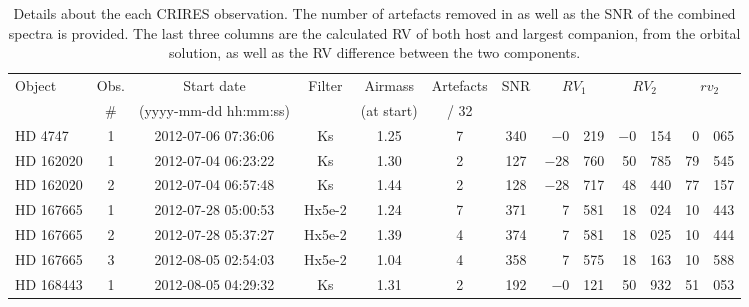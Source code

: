\begin{table*}
    \small
    \centering
    \begin{threeparttable}[b]

        \caption{Details about the each {CRIRES} observation. The number of artefacts removed in  as well as the {SNR} of the combined spectra is provided. The last three columns are the calculated {RV} of both host and largest companion, from the orbital solution, as well as the {RV} difference between the two components.}
        \begin{tabular}{l c c c c c c | r@{.}l r@{.}l r@{.}l}
            \toprule
            Object & Obs.& Start date  & Filter & Airmass  & Artefacts & {SNR} & \multicolumn{2}{c}{\(RV_1\)} & \multicolumn{2}{c}{\(RV_2\)} & \multicolumn{2}{c}{\(rv_2\)}  \\  %
            &  \#   & (yyyy-mm-dd hh:mm:ss)  &  & (at start) & {/ 32} & & \multicolumn{2}{c}{\kmps{}} & \multicolumn{2}{c}{\kmps{}} & \multicolumn{2}{c}{\kmps{}}\\ %
            \midrule
            {HD 4747}   & 1 & 2012-07-06 07:36:06 & Ks            & 1.25     & 7 & 340 & $-$0 & 219 & $-$0  & 154 & 0&065 \\ %
            {HD 162020} & 1 & 2012-07-04 06:23:22 & Ks      & 1.30  & 2 & 127 & $-$28  & 760 & 50 & 785\tnote{a}  & 79&545\tnote{a} \\ %
            {HD 162020} & 2 & 2012-07-04 06:57:48 & Ks      & 1.44   & 2 & 128 & $-$28  & 717 & 48 & 440\tnote{a} & 77&157\tnote{a} \\ %
            {HD 167665} & 1 & 2012-07-28 05:00:53 & Hx5e-2  & 1.24  & 7 & 371 & 7      & 581 & 18 & 024\tnote{a} & 10&443\tnote{a} \\ %
            {HD 167665} & 2 & 2012-07-28 05:37:27 & Hx5e-2  & 1.39   & 4 & 374 & 7      & 581 & 18 & 025\tnote{a}  & 10&444\tnote{a} \\ %
            {HD 167665} & 3 & 2012-08-05 02:54:03 & Hx5e-2  & 1.04   & 4 & 358 & 7      & 575 & 18 & 163\tnote{a} & 10&588\tnote{a} \\ %
            {HD 168443} & 1 & 2012-08-05 04:29:32 & Ks      & 1.31  & 2& 192 & $-$0   & 121 & 50 & 932\tnote{a,b}  & 51&053\tnote{a,b} \\ %

\end{tabular}
\end{threeparttable}
\end{table*}
